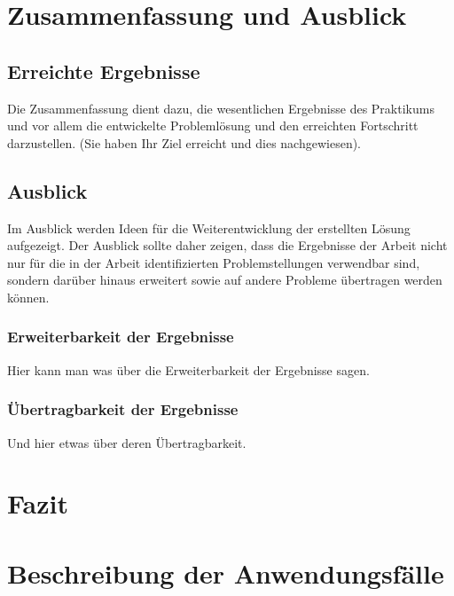 \documentclass[oneside]{ausarbeitung}
\begin{document}
\chapter{Zusammenfassung und Ausblick}
\label{cha:zusammenfassung}

\section{Erreichte Ergebnisse}
\label{sec:ergebnisse}

Die Zusammenfassung dient dazu, die wesentlichen Ergebnisse des 
Praktikums und vor allem die entwickelte Problemlösung und den 
erreichten Fortschritt darzustellen. (Sie haben Ihr Ziel erreicht und 
dies nachgewiesen).

\section{Ausblick}
\label{sec:ausblick}

Im Ausblick werden Ideen für die Weiterentwicklung der erstellten Lösung 
aufgezeigt. Der Ausblick sollte daher zeigen, dass die Ergebnisse der 
Arbeit nicht nur für die in der Arbeit identifizierten Problemstellungen 
verwendbar sind, sondern darüber hinaus erweitert sowie auf andere 
Probleme übertragen werden können.

\subsection{Erweiterbarkeit der Ergebnisse}
\label{sub:erweiterbarkeit}

Hier kann man was über die Erweiterbarkeit der Ergebnisse sagen.

\subsection{Übertragbarkeit der Ergebnisse}
\label{sub:uebertragbarkeit}

Und hier etwas über deren Übertragbarkeit.

\chapter{Fazit}

\appendix

\printbibliography[heading=bibintoc]

\chapter{Beschreibung der Anwendungsfälle}
\label{appendix:use-cases}
\end{document}
